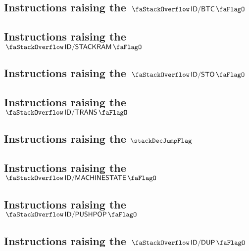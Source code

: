 \subsection{Instructions raising the $\stackDecBtcFlag$           \lispDone{}}   \label{hub: instruction handling: btc}                    
\subsection{Instructions raising the $\stackDecStackRamFlag$      \lispDone{}}   \label{hub: instruction handling: stackRam}               
\subsection{Instructions raising the $\stackDecStoFlag$           \lispDone{}}   \label{hub: instruction handling: sto}                    
\subsection{Instructions raising the $\stackDecTransFlag$         \lispDone{}}   \label{hub: instruction handling: transient}              
\subsection{Instructions raising the $\stackDecJumpFlag$          \lispDone{}}   \label{hub: instruction handling: jump}                   
\subsection{Instructions raising the $\stackDecMachineStateFlag$  \lispDone{}}   \label{hub: instruction handling: machineState}           
\subsection{Instructions raising the $\stackDecPushPopFlag$       \lispDone{}}   \label{hub: instruction handling: pushPop}                
\subsection{Instructions raising the $\stackDecDupFlag$           \lispDone{}}   \label{hub: instruction handling: dup}                    
